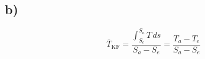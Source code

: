 

\subsection*{b)}
\[
\overline{T}_{\text{KF}} = \frac{\int_{S_e}^{S_a} T \, ds}{S_a - S_e} = \frac{T_a - T_e}{S_a - S_e}
\]